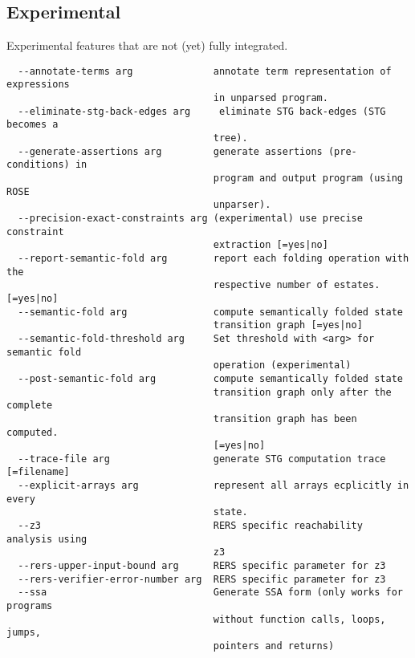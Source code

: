 \documentclass[natbib]{article}
\begin{document}
\subsection{Experimental}
Experimental features that are not (yet) fully integrated.
\begin{verbatim}
  --annotate-terms arg              annotate term representation of expressions
                                    in unparsed program.
  --eliminate-stg-back-edges arg     eliminate STG back-edges (STG becomes a 
                                    tree).
  --generate-assertions arg         generate assertions (pre-conditions) in 
                                    program and output program (using ROSE 
                                    unparser).
  --precision-exact-constraints arg (experimental) use precise constraint 
                                    extraction [=yes|no]
  --report-semantic-fold arg        report each folding operation with the 
                                    respective number of estates. [=yes|no]
  --semantic-fold arg               compute semantically folded state 
                                    transition graph [=yes|no]
  --semantic-fold-threshold arg     Set threshold with <arg> for semantic fold 
                                    operation (experimental)
  --post-semantic-fold arg          compute semantically folded state 
                                    transition graph only after the complete 
                                    transition graph has been computed. 
                                    [=yes|no]
  --trace-file arg                  generate STG computation trace [=filename]
  --explicit-arrays arg             represent all arrays ecplicitly in every 
                                    state.
  --z3                              RERS specific reachability analysis using 
                                    z3
  --rers-upper-input-bound arg      RERS specific parameter for z3
  --rers-verifier-error-number arg  RERS specific parameter for z3
  --ssa                             Generate SSA form (only works for programs 
                                    without function calls, loops, jumps, 
                                    pointers and returns)
\end{verbatim}
\end{document}
